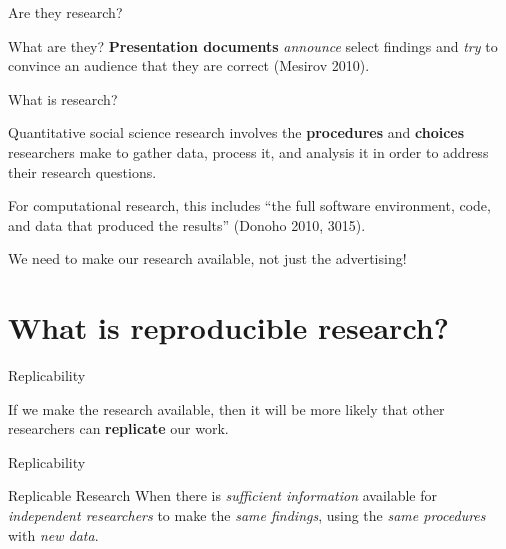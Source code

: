 \documentclass[10pt]{beamer}
\begin{document}
\begin{frame}{Are they research?}

    \begin{block}{What are they?}
        \textbf{Presentation documents} \emph{announce} select findings and \emph{try} to convince an audience that they are correct (Mesirov 2010).
    \end{block}
\end{frame}

\begin{frame}{What is research?}

    Quantitative social science research involves the \textbf{procedures} and \textbf{choices} researchers make to gather data, process it, and analysis it in order to address their research questions.

    \vspace{1cm}

    For {\large{computational research}}, this includes ``the {\large{full software environment, code, and data}} that produced the results'' (Donoho 2010, 3015).

\end{frame}

\begin{frame}
    \begin{center}
        {\large{We need to make our research available, not just the advertising!}}
    \end{center}
\end{frame}


\section{What is reproducible research?}

\begin{frame}{Replicability}

    If we make the research available, then it will be {\large{more likely}} that other researchers can \textbf{replicate} our work.

\end{frame}

\begin{frame}{Replicability}

    \begin{exampleblock}{Replicable Research}
        When there is \emph{sufficient information} available for \emph{independent researchers} to make the \emph{same findings}, using the \emph{same procedures} with \emph{new data}.
    \end{exampleblock}

\end{frame}
\end{document}
